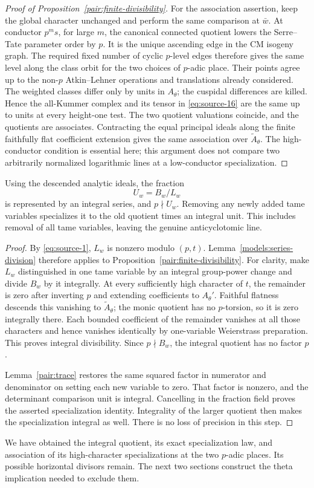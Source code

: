 \begin{proof}[Proof of Proposition~\ref{pair:finite-divisibility}]
For the association assertion, keep the global character unchanged
and perform the same comparison at \(\bar w\).
At conductor \(p^ms\), for large \(m\), the canonical connected
quotient lowers the Serre--Tate parameter order by \(p\).
It is the unique ascending edge in the CM isogeny graph.
The required fixed number of cyclic \(p\)-level edges therefore
gives the same level along the class orbit for the two choices
of \(p\)-adic place.  Their points agree up to the non-\(p\)
Atkin--Lehner operations and translations already considered.
The weighted classes differ only by units in \(A_\theta\);
the cuspidal differences are killed.  Hence the all-Kummer
complex and its tensor in \eqref{eq:source-16} are the same up to
units at every height-one test.  The two quotient valuations
coincide, and the quotients are associates.  Contracting the equal
principal ideals along the finite faithfully flat coefficient
extension gives the same association over
\(\widetilde A_\theta\).
The high-conductor
condition is essential here; this argument does not compare two
arbitrarily normalized logarithmic lines at a low-conductor
specialization.
\end{proof}

\begin{corollary}
\label{pair:integral-quotient}
Using the descended analytic ideals, the fraction
\[
 U_w=B_w/L_w
\]
is represented by an integral series, and \(p\nmid U_w\).
Removing any newly added tame variables specializes it to the
old quotient times an integral unit.  This includes removal of
all tame variables, leaving the genuine anticyclotomic line.
\end{corollary}

\begin{proof}
By \eqref{eq:source-1}, \(L_w\) is nonzero modulo \((p,t)\).
Lemma~\ref{models:series-division}
therefore applies to Proposition~\ref{pair:finite-divisibility}.
For clarity, make \(L_w\) distinguished in one tame variable by
an integral group-power change and divide \(B_w\) by it
integrally.  At every sufficiently high character of \(t\), the
remainder is zero after inverting \(p\) and extending coefficients
to \(A_\theta'\).  Faithful flatness descends this vanishing to
\(\widetilde A_\theta\); the monic quotient has
no \(p\)-torsion, so it is zero integrally there.  Each bounded
coefficient of the remainder vanishes at all those characters
and hence vanishes identically by one-variable Weierstrass
preparation.  This proves integral divisibility.  Since
\(p\nmid B_w\), the integral quotient has no factor \(p\).

Lemma~\ref{pair:trace} restores the same squared factor in
numerator and denominator on setting each new variable to zero.
That factor is nonzero, and the determinant comparison unit is
integral.  Cancelling in the fraction field proves the asserted
specialization identity.  Integrality of the larger quotient
then makes the specialization integral as well.  There is no
loss of precision in this step.
\end{proof}

We have obtained the integral quotient, its exact specialization
law, and association of its high-character specializations at the
two \(p\)-adic places.  Its possible horizontal divisors remain.
The next two sections construct the theta implication needed to
exclude them.
